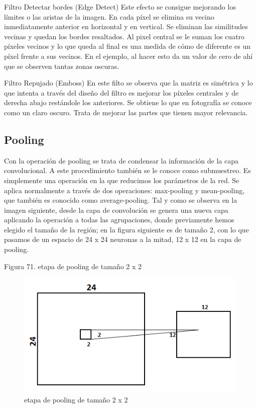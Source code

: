 \documentclass[
  a4paper,
  DIV=11,
  numbers=noendperiod]{scrreprt}
\begin{document}
Filtro Detectar bordes (Edge Detect) Este efecto se consigue mejorando
los límites o las aristas de la imagen. En cada píxel se elimina su
vecino inmediatamente anterior en horizontal y en vertical. Se eliminan
las similitudes vecinas y quedan los bordes resaltados. Al pixel central
se le suman los cuatro píxeles vecinos y lo que queda al final es una
medida de cómo de diferente es un píxel frente a sus vecinos. En el
ejemplo, al hacer esto da un valor de cero de ahí que se observen tantas
zonas oscuras.

Filtro Repujado (Emboss) En este filto se observa que la matriz es
simétrica y lo que intenta a través del diseño del filtro es mejorar los
píxeles centrales y de derecha abajo restándole los anteriores. Se
obtiene lo que en fotografía se conoce como un claro oscuro. Trata de
mejorar las partes que tienen mayor relevancia.

\hypertarget{pooling}{%
\subsection{Pooling}\label{pooling}}

Con la operación de pooling se trata de condensar la información de la
capa convolucional. A este procedimiento también se le conoce como
submuestreo. Es simplemente una operación en la que reducimos los
parámetros de la red. Se aplica normalmente a través de dos operaciones:
max-pooling y mean-pooling, que también es conocido como
average-pooling. Tal y como se observa en la imagen siguiente, desde la
capa de convolución se genera una nueva capa aplicando la operación a
todas las agrupaciones, donde previamente hemos elegido el tamaño de la
región; en la figura siguiente es de tamaño 2, con lo que pasamos de un
espacio de 24 x 24 neuronas a la mitad, 12 x 12 en la capa de pooling.

Figura 71. etapa de pooling de tamaño 2 x 2

\begin{figure}

{\centering \includegraphics{imagenes/capitulo1/pooling.png}

}

\caption{\label{fig-pooling}etapa de pooling de tamaño 2 x 2}

\end{figure}
\end{document}
